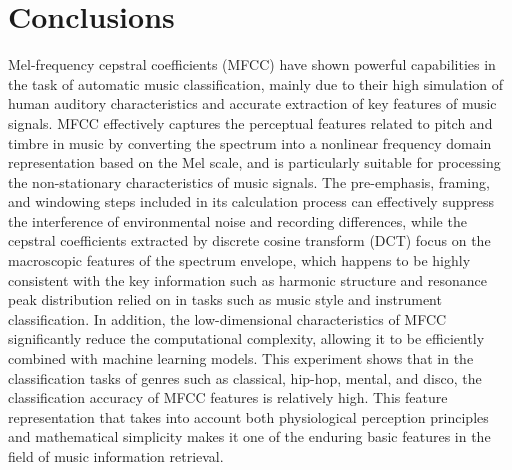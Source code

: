 \chapter*{Conclusions}
Mel-frequency cepstral coefficients (MFCC) have shown powerful capabilities in the task of automatic music classification, mainly due to their high simulation of human auditory characteristics and accurate extraction of key features of music signals. MFCC effectively captures the perceptual features related to pitch and timbre in music by converting the spectrum into a nonlinear frequency domain representation based on the Mel scale, and is particularly suitable for processing the non-stationary characteristics of music signals. The pre-emphasis, framing, and windowing steps included in its calculation process can effectively suppress the interference of environmental noise and recording differences, while the cepstral coefficients extracted by discrete cosine transform (DCT) focus on the macroscopic features of the spectrum envelope, which happens to be highly consistent with the key information such as harmonic structure and resonance peak distribution relied on in tasks such as music style and instrument classification. In addition, the low-dimensional characteristics of MFCC significantly reduce the computational complexity, allowing it to be efficiently combined with machine learning models. This experiment shows that in the classification tasks of genres such as classical, hip-hop, mental, and disco, the classification accuracy of MFCC features is relatively high. This feature representation that takes into account both physiological perception principles and mathematical simplicity makes it one of the enduring basic features in the field of music information retrieval.\\
\\
